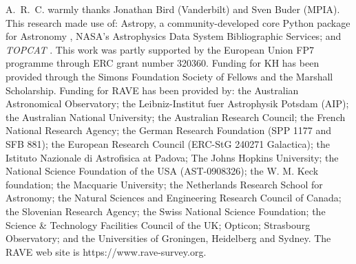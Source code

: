 \documentclass[preprint,trackchanges]{aastex}
\newcommand{\project}[1]{\textsl{#1}}
\begin{document}
\acknowledgements
A.~R.~C. warmly thanks Jonathan Bird (Vanderbilt) and Sven Buder (MPIA).
This research made use of: Astropy, a community-developed core Python package for
Astronomy \citep{astropy}, NASA's Astrophysics Data System Bibliographic Services;
and \project{TOPCAT} \citep{Taylor_2005}.
This work was partly supported by the European Union FP7 programme through ERC 
grant number 320360. Funding for KH has been provided through the Simons Foundation Society of Fellows and the Marshall Scholarship.
Funding for RAVE has been provided by: the Australian Astronomical Observatory; 
the Leibniz-Institut fuer Astrophysik Potsdam (AIP); the Australian National 
University; the Australian Research Council; the French National Research Agency;
the German Research Foundation (SPP 1177 and SFB 881); the European Research 
Council (ERC-StG 240271 Galactica); the Istituto Nazionale di Astrofisica at 
Padova; The Johns Hopkins University; the National Science Foundation of the USA
(AST-0908326); the W. M. Keck foundation; the Macquarie University; the 
Netherlands Research School for Astronomy; the Natural Sciences and Engineering 
Research Council of Canada; the Slovenian Research Agency; the Swiss National 
Science Foundation; the Science \& Technology Facilities Council of the UK; 
Opticon; Strasbourg Observatory; and the Universities of Groningen, Heidelberg 
and Sydney. The RAVE web site is https://www.rave-survey.org.  
\end{document}
